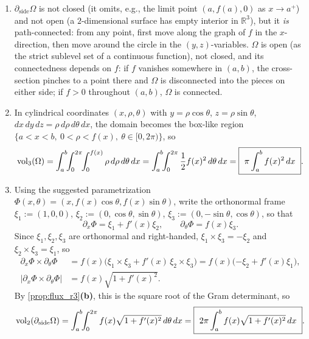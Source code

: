 \begin{exercisesolution}
\label{sol:solids_of_revolution_area}
\begin{enumerate}[label=\textbf{(\alph*)}]
  \item $\partial_{\mathrm{side}}\Omega$ is not closed (it omits, e.g., the limit
    point $(a,f(a),0)$ as $x\to a^+$) and not open (a $2$-dimensional surface has empty interior
    in $\mathbb{R}^3$), but it \emph{is} path-connected: from any point, first move along the
    graph of $f$ in the $x$-direction, then move around the circle in the $(y,z)$-variables.
    $\Omega$ is open (as the strict sublevel set of a continuous function), not closed, and its
    connectedness depends on $f$: if $f$ vanishes somewhere in $(a,b)$, the cross-section pinches
    to a point there and $\Omega$ is disconnected into the pieces on either side; if $f>0$
    throughout $(a,b)$, $\Omega$ is connected.

  \item In cylindrical coordinates $(x,\rho,\theta)$ with $y=\rho\cos\theta$,
    $z=\rho\sin\theta$, $dx\,dy\,dz = \rho\,d\rho\,d\theta\,dx$, the domain becomes the box-like
    region $\{a<x<b,\ 0<\rho<f(x),\ \theta\in[0,2\pi)\}$, so
    \[\operatorname{vol}_3(\Omega) = \int_a^b\!\!\int_0^{2\pi}\!\!\int_0^{f(x)} \rho\,d\rho\,d\theta\,dx
      = \int_a^b\!\!\int_0^{2\pi} \frac12 f(x)^2\,d\theta\,dx
      = \boxed{\ \pi\int_a^b f(x)^2\,dx\ }.\]

  \item Using the suggested parametrization $\Phi(x,\theta) = (x,f(x)\cos\theta,
    f(x)\sin\theta)$, write the orthonormal frame $\xi_1:=(1,0,0)$, $\xi_2:=(0,\cos\theta,
    \sin\theta)$, $\xi_3:=(0,-\sin\theta,\cos\theta)$, so that
    \[\partial_x\Phi = \xi_1 + f'(x)\xi_2, \qquad \partial_\theta\Phi = f(x)\xi_3.\]
    Since $\xi_1,\xi_2,\xi_3$ are orthonormal and right-handed, $\xi_1\times\xi_3=-\xi_2$ and
    $\xi_2\times\xi_3=\xi_1$, so
    \begin{align*}
      \partial_x\Phi\times\partial_\theta\Phi
        &= f(x)\big(\xi_1\times\xi_3 + f'(x)\,\xi_2\times\xi_3\big)
         = f(x)\big({-\xi_2}+f'(x)\xi_1\big), \\
      \lvert\partial_x\Phi\times\partial_\theta\Phi\rvert &= f(x)\sqrt{1+f'(x)^2}.
    \end{align*}
    By \cref{prop:flux_r3}\textbf{(b)}, this is the square root of the Gram determinant, so
    \[\vol_2(\partial_{\mathrm{side}}\Omega) = \int_a^b\!\!\int_0^{2\pi} f(x)\sqrt{1+f'(x)^2}\,
      d\theta\,dx = \boxed{\ 2\pi\int_a^b f(x)\sqrt{1+f'(x)^2}\,dx\ }.\]


\end{enumerate}
\end{exercisesolution}
